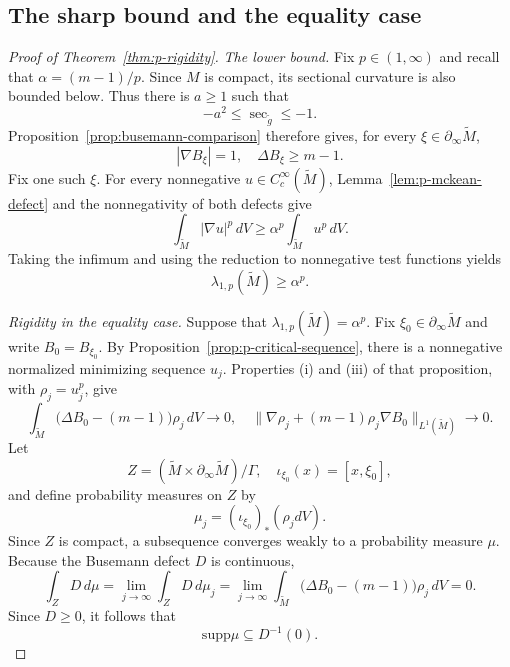 \documentclass[12pt]{amsart}
\theoremstyle{definition}
\numberwithin{equation}{section}
\newcommand{\wti}{\widetilde}
\newcommand{\supp}{\mathrm{supp}}
\begin{document}
\subsection{The sharp bound and the equality case}

\begin{proof}[Proof of Theorem~\ref{thm:p-rigidity}]
\emph{The lower bound.}
Fix \(p\in(1,\infty)\) and recall that \(\alpha=(m-1)/p\).
Since \(M\) is compact, its sectional curvature is also bounded below.
Thus there is \(a\geq1\) such that
\[
  -a^2\leq\sec_{\wti g}\leq-1.
\]
Proposition~\ref{prop:busemann-comparison} therefore gives, for every
\(\xi\in\partial_\infty\wti M\),
\[
  |\nabla B_\xi|=1,
  \quad
  \Delta B_\xi\geq m-1.
\]
Fix one such \(\xi\).  For every nonnegative
\(u\in C_c^\infty(\wti M)\), Lemma~\ref{lem:p-mckean-defect} and the
nonnegativity of both defects give
\[
  \int_{\wti M}|\nabla u|^p\,dV
  \geq\alpha^p\int_{\wti M}u^p\,dV.
\]
Taking the infimum and using the reduction to nonnegative test
functions yields
\[
  \lambda_{1,p}(\wti M)\geq\alpha^p.
\]

\emph{Rigidity in the equality case.}
Suppose that \(\lambda_{1,p}(\wti M)=\alpha^p\).
Fix \(\xi_0\in\partial_\infty\wti M\) and write
\(B_0=B_{\xi_0}\).  By
Proposition~\ref{prop:p-critical-sequence}, there is a nonnegative
normalized minimizing sequence \(u_j\).  Properties \textup{(i)} and
\textup{(iii)} of that proposition, with \(\rho_j=u_j^p\), give
\[
  \int_{\wti M}
    \bigl(\Delta B_0-(m-1)\bigr)\rho_j\,dV\longrightarrow0,
  \quad
  \|\nabla\rho_j+(m-1)\rho_j\nabla B_0\|_{L^1(\wti M)}
  \longrightarrow0.
\]
Let
\[
  Z=(\wti M\times\partial_\infty\wti M)/\Gamma,
  \quad
  \iota_{\xi_0}(x)=[x,\xi_0],
\]
and define probability measures on \(Z\) by
\[
  \mu_j=(\iota_{\xi_0})_*(\rho_jdV).
\]
Since \(Z\) is compact, a subsequence converges weakly to a probability
measure \(\mu\).  Because the Busemann defect \(D\) is continuous,
\[
  \int_ZD\,d\mu
  =\lim_{j\to\infty}\int_ZD\,d\mu_j
  =\lim_{j\to\infty}\int_{\wti M}
    \bigl(\Delta B_0-(m-1)\bigr)\rho_j\,dV
  =0.
\]
Since \(D\geq0\), it follows that
\begin{equation}\label{eq:p-limit-support}
  \supp\mu\subseteq D^{-1}(0).
\end{equation}


\end{proof}
\end{document}
